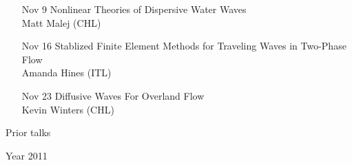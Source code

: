 \documentclass[12]{article}
\begin{document}
\begin{enumerate}
\item[Nov 9] Nonlinear Theories of Dispersive Water Waves\\
Matt Malej (CHL)\\

\item[Nov 16] Stablized Finite Element Methods for Traveling Waves in Two-Phase Flow\\
Amanda Hines (ITL)\\

\item[Nov 23] Diffusive Waves For Overland Flow\\
Kevin Winters (CHL)\\

\end{enumerate}

\begin{center}
\Large
Prior talks
\end{center}

\begin{center}
\Large
Year 2011
\end{center}
\end{document}
